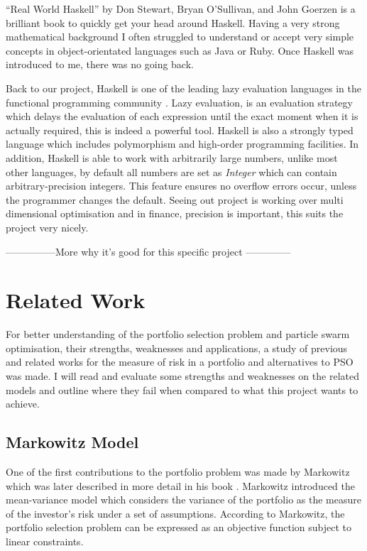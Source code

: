\documentclass{pdfmx4020}
\begin{document}
  ``Real World Haskell'' by Don Stewart, Bryan O'Sullivan, and John Goerzen is a brilliant book to quickly get your head around Haskell. Having a very strong mathematical background I often struggled to understand or accept very simple concepts in object-orientated languages such as Java or Ruby. Once Haskell was introduced to me, there was no going back.

  Back to our project, Haskell is one of the leading lazy evaluation languages in the functional programming community \cite{lazy}. Lazy evaluation, is an evaluation strategy which delays the evaluation of each expression until the exact moment when it is actually required, this is indeed a powerful tool. Haskell is also a strongly typed language which includes polymorphism and high-order programming facilities. In addition, Haskell is able to work with arbitrarily large numbers, unlike most other languages, by default all numbers are set as \textit{Integer} which can contain arbitrary-precision integers. This feature ensures no overflow errors occur, unless the programmer changes the default. Seeing out project is working over multi dimensional optimisation and in finance, precision is important, this suits the project very nicely.

  ---------------More why it's good for this specific project --------------

    


\chapter{Related Work}
For better understanding of the portfolio selection problem and particle swarm optimisation, their strengths, weaknesses and applications, a study of previous and related works for the measure of risk in a portfolio and alternatives to PSO was made. I will read and evaluate some strengths and weaknesses on the related models and outline where they fail when compared to what this project wants to achieve. 

  \section{Markowitz Model} %
  \label{sec:markowitz_model}
    One of the first contributions to the portfolio problem was made by Markowitz \cite{marko1} which was later described in more detail in his book \cite{marko2}. Markowitz introduced the mean-variance model which considers the variance of the portfolio as the measure of the investor's risk under a set of assumptions. According to Markowitz, the portfolio selection problem can be expressed as an objective function subject to linear constraints. 
\end{document}
